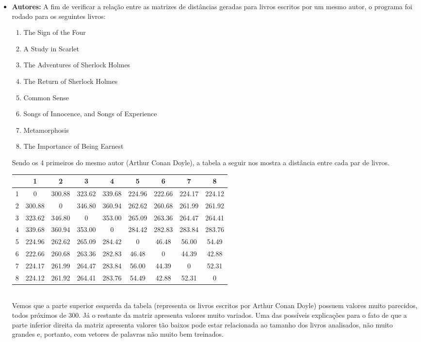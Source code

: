 \documentclass[12pt]{article}
\begin{document}
\begin{itemize}
	\item \textbf{Autores:} A fim de verificar a relação entre as
	matrizes de distâncias geradas para livros escritos por um mesmo
	autor, o programa foi rodado para os seguintes livros:

	\begin{enumerate}
		\item The Sign of the Four
		\item A Study in Scarlet
		\item The Adventures of Sherlock Holmes
		\item The Return of Sherlock Holmes
		\item Common Sense
		\item Songs of Innocence, and Songs of Experience
		\item Metamorphosis
		\item The Importance of Being Earnest
	\end{enumerate}

	Sendo os 4 primeiros do mesmo autor (Arthur Conan Doyle), a tabela
	a seguir nos mostra a distância entre cada par de livros.

	\begin{center}
		\begin{tabular}{ |c|c|c|c|c|c|c|c|c| }
		\hline
		 & 1 & 2 & 3 & 4 & 5 & 6 & 7 & 8 \\ \hline
		1 & 0 & 300.88 & 323.62 & 339.68 & 224.96 & 222.66 & 224.17 & 224.12 \\
		2 & 300.88 & 0 & 346.80 & 360.94 & 262.62 & 260.68 & 261.99 & 261.92 \\ 
		3 & 323.62 & 346.80 & 0 & 353.00 & 265.09 & 263.36 & 264.47 & 264.41 \\ 
		4 & 339.68 & 360.94 & 353.00 & 0 & 284.42 & 282.83 & 283.84 & 283.76 \\ 
		5 & 224.96 & 262.62 & 265.09 & 284.42 & 0 & 46.48 & 56.00 & 54.49 \\ 
		6 & 222.66 & 260.68 & 263.36 & 282.83 & 46.48 & 0 & 44.39 & 42.88 \\ 
		7 & 224.17 & 261.99 & 264.47 & 283.84 & 56.00 & 44.39 & 0 & 52.31 \\ 
		8 & 224.12 & 261.92 & 264.41 & 283.76 & 54.49 & 42.88 & 52.31 & 0 \\ 
		\hline
		\end{tabular}
	\end{center}

	\mbox{}\\
	Vemos que a parte superior esquerda da tabela (representa os livros escritos por Arthur Conan Doyle) possuem valores muito parecidos, todos próximos de 300. Já o restante da matriz apresenta valores muito variados. Uma das possíveis explicações para o fato de que a 
	parte inferior direita da matriz apresenta valores tão baixos pode
	estar relacionada ao tamanho dos livros analisados, não muito grandes e, portanto, com vetores de palavras não muito bem treinados. \\


\end{itemize}
\end{document}
